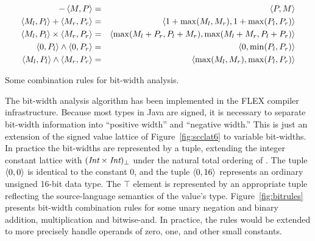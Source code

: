 \documentclass[12pt,titlepage,twoside]{article}
\begin{document}
\begin{myfigure}
\begin{eqnarray*}
-\left\langle M,P \right\rangle &=& \left\langle P,M \right\rangle\\
\left\langle M_l,P_l \right\rangle + \left\langle M_r,P_r \right\rangle &=& \left\langle 1+\max(M_l,M_r),1+\max(P_l,P_r) \right\rangle\\
\left\langle M_l,P_l \right\rangle \times \left\langle M_r,P_r \right\rangle &=& \left\langle \max(M_l+P_r,P_l+M_r),
                                             \max(M_l+M_r,P_l+P_r) \right\rangle\\
\left\langle 0,P_l \right\rangle \wedge \left\langle 0,P_r \right\rangle &=& \left\langle 0,\min(P_l,P_r) \right\rangle\\
\left\langle M_l,P_l \right\rangle\wedge \left\langle M_r,P_r \right\rangle &=& \left\langle \max(M_l,M_r),\max(P_l,P_r) \right\rangle
\end{eqnarray*}%
\caption{Some combination rules for bit-width analysis.}\label{fig:bitrules}
\end{myfigure}
The bit-width analysis algorithm has been implemented in the FLEX
compiler infrastructure.  Because most types in Java are signed, it is
necessary to separate bit-width information into ``positive width''
and ``negative width.''  This is just an extension of the
signed value lattice of Figure~\ref{fig:scclat6} to variable
bit-widths.  In practice the bit-widths are represented by a tuple,
extending the integer constant lattice with
$({\mbox{\em Int}}\times{\mbox{\em Int}})_{\bot}$ under the natural total
ordering of .  The tuple $\left\langle 0,0 \right\rangle$ is identical to the
constant 0, and the tuple $\left\langle 0,16 \right\rangle$ represents an ordinary
unsigned 16-bit data type.  The $\top$ element is represented by an
appropriate tuple reflecting the source-language semantics of the
value's type.  Figure~\ref{fig:bitrules} presents bit-width
combination rules for some unary negation and binary addition,
multiplication and bitwise-and.  In practice, the rules would be
extended to more precisely handle operands of zero, one, and other
small constants.
\end{document}
